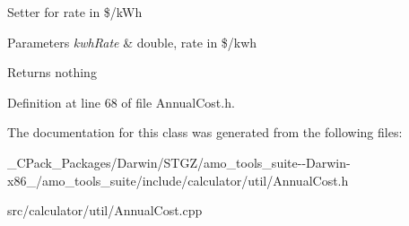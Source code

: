 Setter for rate in \$/k\+Wh 
\begin{DoxyParams}{Parameters}
{\em kwh\+Rate} & double, rate in \$/kwh \\
\hline
\end{DoxyParams}
\begin{DoxyReturn}{Returns}
nothing 
\end{DoxyReturn}


Definition at line 68 of file Annual\+Cost.\+h.



The documentation for this class was generated from the following files\+:\begin{DoxyCompactItemize}
\item 
\+\_\+\+C\+Pack\+\_\+\+Packages/\+Darwin/\+S\+T\+G\+Z/amo\+\_\+tools\+\_\+suite-\/-\/\+Darwin-\/x86\+\_/amo\+\_\+tools\+\_\+suite/include/calculator/util/Annual\+Cost.\+h\item 
src/calculator/util/Annual\+Cost.\+cpp\end{DoxyCompactItemize}
